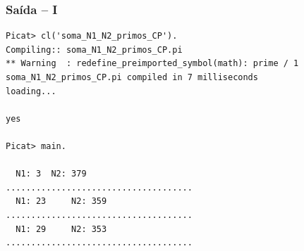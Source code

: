 \begin{frame}[fragile]

\frametitle{Saída -- I}

\begin{small}
\begin{verbatim}
Picat> cl('soma_N1_N2_primos_CP').
Compiling:: soma_N1_N2_primos_CP.pi
** Warning  : redefine_preimported_symbol(math): prime / 1
soma_N1_N2_primos_CP.pi compiled in 7 milliseconds
loading...

yes

Picat> main.                      

  N1: 3	 N2: 379
.....................................
  N1: 23	 N2: 359
.....................................
  N1: 29	 N2: 353
.....................................
\end{verbatim}
    
\end{small}
\end{frame}


